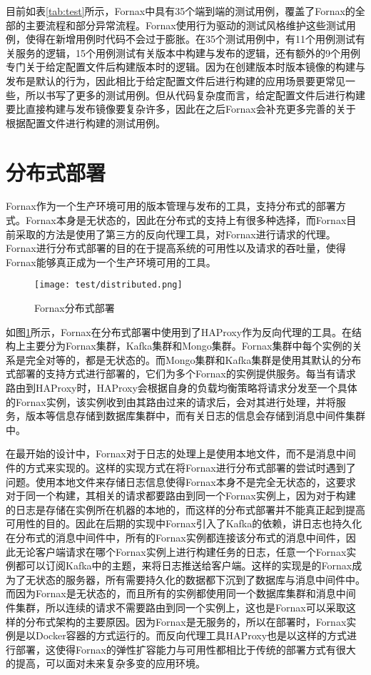 目前如表\ref{tab:test}所示，Fornax中具有35个端到端的测试用例，覆盖了Fornax的全部的主要流程和部分异常流程。Fornax使用行为驱动的测试风格维护这些测试用例，使得在新增用例时代码不会过于膨胀。在35个测试用例中，有11个用例测试有关服务的逻辑，15个用例测试有关版本中构建与发布的逻辑，还有额外的9个用例专门关于给定配置文件后构建版本时的逻辑。因为在创建版本时版本镜像的构建与发布是默认的行为，因此相比于给定配置文件后进行构建的应用场景要更常见一些，所以书写了更多的测试用例。但从代码复杂度而言，给定配置文件后进行构建要比直接构建与发布镜像要复杂许多，因此在之后Fornax会补充更多完善的关于根据配置文件进行构建的测试用例。

\section{分布式部署}

Fornax作为一个生产环境可用的版本管理与发布的工具，支持分布式的部署方式。Fornax本身是无状态的，因此在分布式的支持上有很多种选择，而Fornax目前采取的方法是使用了第三方的反向代理工具，对Fornax进行请求的代理。Fornax进行分布式部署的目的在于提高系统的可用性以及请求的吞吐量，使得Fornax能够真正成为一个生产环境可用的工具。

\begin{figure}[!htp]
  \centering
  \texttt{[image: test/distributed.png]}
  \caption{Fornax分布式部署}
  \label{fig:distributed}
\end{figure}

如图\ref{fig:distributed}所示，Fornax在分布式部署中使用到了HAProxy作为反向代理的工具。在结构上主要分为Fornax集群，Kafka集群和Mongo集群。Fornax集群中每个实例的关系是完全对等的，都是无状态的。而Mongo集群和Kafka集群是使用其默认的分布式部署的支持方式进行部署的，它们为多个Fornax的实例提供服务。每当有请求路由到HAProxy时，HAProxy会根据自身的负载均衡策略将请求分发至一个具体的Fornax实例，该实例收到由其路由过来的请求后，会对其进行处理，并将服务，版本等信息存储到数据库集群中，而有关日志的信息会存储到消息中间件集群中。

在最开始的设计中，Fornax对于日志的处理上是使用本地文件，而不是消息中间件的方式来实现的。这样的实现方式在将Fornax进行分布式部署的尝试时遇到了问题。使用本地文件来存储日志信息使得Fornax本身不是完全无状态的，这要求对于同一个构建，其相关的请求都要路由到同一个Fornax实例上，因为对于构建的日志是存储在实例所在机器的本地的，而这样的分布式部署并不能真正起到提高可用性的目的。因此在后期的实现中Fornax引入了Kafka的依赖，讲日志也持久化在分布式的消息中间件中，所有的Fornax实例都连接该分布式的消息中间件，因此无论客户端请求在哪个Fornax实例上进行构建任务的日志，任意一个Fornax实例都可以订阅Kafka中的主题，来将日志推送给客户端。这样的实现是的Fornax成为了无状态的服务器，所有需要持久化的数据都下沉到了数据库与消息中间件中。而因为Fornax是无状态的，而且所有的实例都使用同一个数据库集群和消息中间件集群，所以连续的请求不需要路由到同一个实例上，这也是Fornax可以采取这样的分布式架构的主要原因。因为Fornax是无服务的，所以在部署时，Fornax实例是以Docker容器的方式运行的。而反向代理工具HAProxy也是以这样的方式进行部署，这使得Fornax的弹性扩容能力与可用性都相比于传统的部署方式有很大的提高，可以面对未来复杂多变的应用环境。

